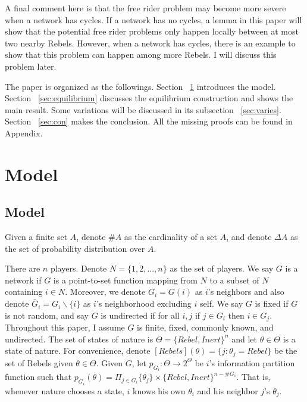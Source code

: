 \documentclass[12pt,letter]{article}
\theoremstyle{definition}
\theoremstyle{remark}
\theoremstyle{claim}
\begin{document}
A final comment here is that the free rider problem may become more severe when a network has cycles. If a network has no cycles, a lemma in this paper will show that the potential free rider problems only happen locally between at most two nearby Rebels. However, when a network has cycles, there is an example to show that this problem can happen among more Rebels. I will discuss this problem later.

The paper is organized as the followings. Section ~\ref{sec:model} introduces the model. Section ~\ref{sec:equilibrium} discusses the equilibrium construction and shows the main result. Some variations will be discussed in its subsection ~\ref{sec:varies}. Section ~\ref{sec:con} makes the conclusion. All the missing proofs can be found in Appendix.

\section{Model}
\label{sec:model}
\subsection{Model}
Given a finite set $A$, denote $\#A$ as the cardinality of a set $A$, and denote $\Delta A$ as the set of probability distribution over $A$.

There are $n$ players. Denote $N=\{1,2,...,n\}$ as the set of players.  We say $G$ is a network if $G$ is a point-to-set function mapping from $N$ to a subset of $N$ containing $i\in N$. Moreover, we denote $G_i=G(i)$ as $i$'s neighbors and also denote $\bar{G}_i=G_i\backslash \{i\}$ as $i$'s neighborhood excluding $i$ self. We say $G$ is fixed if $G$ is not random, and say $G$ is undirected if for all $i,j$ if $j\in G_i$ then $i\in G_j$. Throughout this paper, I assume $G$ is finite, fixed, commonly known, and undirected. The set of states of nature is $\Theta=\{Rebel,Inert\}^n$ and let $\theta\in \Theta$ is a state of nature. For convenience, denote $[Rebels](\theta)=\{j:\theta_j=Rebel\}$ be the set of Rebels given $\theta\in \Theta$. Given $G$, let $p_{G_i}:\Theta \rightarrow 2^{\Theta}$ be $i$'s information partition function such that $p_{G_i}(\theta)=\Pi_{j\in G_i}\{\theta_j\}\times \{Rebel,Inert\}^{n-\#G_{i}}$. That is, whenever nature chooses a state, $i$ knows his own $\theta_i$ and his neighbor $j$'s $\theta_j$. 
\end{document}
